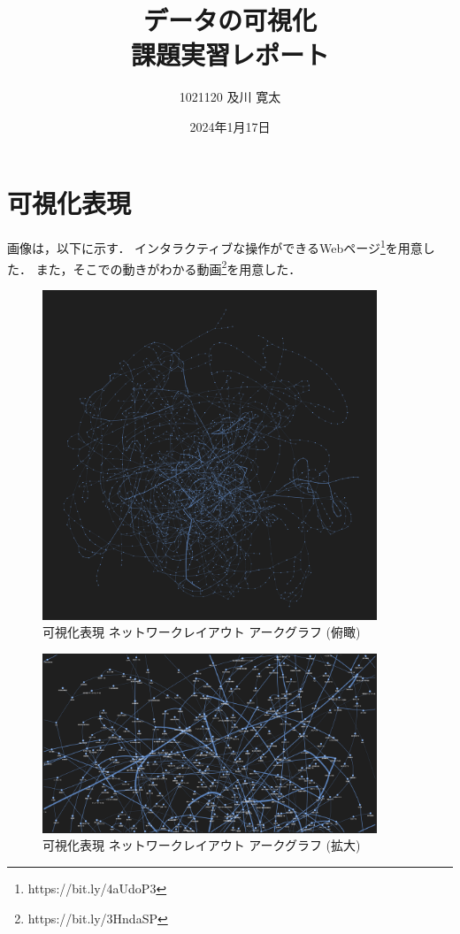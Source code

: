 \documentclass[12pt,a4paper,dvipdfmx,titlepage]{jsarticle}
\begin{document}
\title{
    データの可視化 \\
    \large 課題実習レポート
}

\author{1021120 及川 寛太}

\date{2024年1月17日}

\maketitle

\section*{可視化表現}
画像は，以下に示す．
インタラクティブな操作ができるWebページ\footnote{https://bit.ly/4aUdoP3}を用意した．
また，そこでの動きがわかる動画\footnote{https://bit.ly/3HndaSP}を用意した．

\begin{figure}[H]
    \centering
    \includegraphics[width=10cm]{./img/fig1.png}
    \caption{可視化表現 ネットワークレイアウト アークグラフ (俯瞰)}
    \label{fig:fig1}
\end{figure}

\begin{figure}[H]
    \centering
    \includegraphics[width=10cm]{./img/fig2.png}
    \caption{可視化表現 ネットワークレイアウト アークグラフ (拡大)}
    \label{fig:fig2}
\end{figure}
\end{document}
